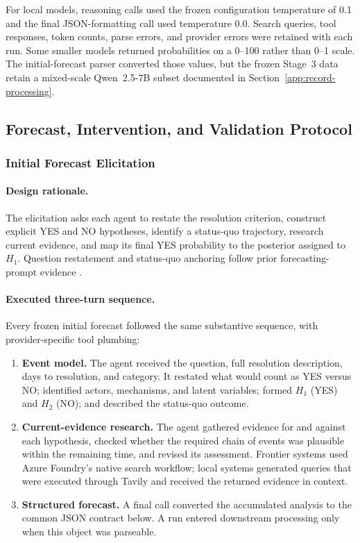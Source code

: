 For local models, reasoning calls used the frozen configuration temperature of 0.1 and
the final JSON-formatting call used temperature 0.0.  Search queries, tool responses,
token counts, parse errors, and provider errors were retained with each run.  Some
smaller models returned probabilities on a 0--100 rather than 0--1 scale.  The
initial-forecast parser converted those values, but the frozen Stage~3 data retain a
mixed-scale Qwen~2.5-7B subset documented in
Section~\ref{app:record-processing}.

\subsection{Forecast, Intervention, and Validation Protocol}
\label{app:exp1-protocol}

\subsubsection{Initial Forecast Elicitation}
\label{app:prompts}

\paragraph{Design rationale.}
The elicitation asks each agent to restate the resolution criterion, construct
explicit YES and NO hypotheses, identify a status-quo trajectory, research
current evidence, and map its final YES probability to the posterior assigned to
$H_1$. Question restatement and status-quo anchoring follow prior
forecasting-prompt evidence \citep{halawi2024approaching,wilson2025automated}.

\paragraph{Executed three-turn sequence.}
Every frozen initial forecast followed the same substantive sequence, with
provider-specific tool plumbing:

\begin{enumerate}
  \item \textbf{Event model.}  The agent received the question, full resolution
        description, days to resolution, and category.  It restated what would count
        as YES versus NO; identified actors, mechanisms, and latent variables; formed
        $H_1$ (YES) and $H_2$ (NO); and described the status-quo outcome.
  \item \textbf{Current-evidence research.}  The agent gathered evidence for and
        against each hypothesis, checked whether the required chain of events was
        plausible within the remaining time, and revised its assessment.  Frontier
        systems used Azure Foundry's native search workflow; local systems generated
        queries that were executed through Tavily and received the returned evidence
        in context.
  \item \textbf{Structured forecast.}  A final call converted the accumulated analysis
        to the common JSON contract below.  A run entered downstream processing only
        when this object was parseable.
\end{enumerate}


